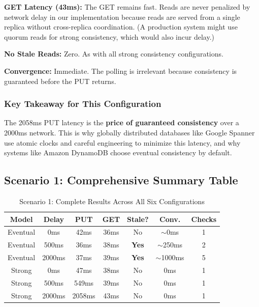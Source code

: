 \documentclass[10pt,a4paper]{article}
\begin{document}
\textbf{GET Latency (43ms):} The GET remains fast. Reads are never penalized by network delay in our implementation because reads are served from a single replica without cross-replica coordination. (A production system might use quorum reads for strong consistency, which would also incur delay.)

\textbf{No Stale Reads:} Zero. As with all strong consistency configurations.

\textbf{Convergence:} Immediate. The polling is irrelevant because consistency is guaranteed before the PUT returns.

\subsubsection{Key Takeaway for This Configuration}

The 2058ms PUT latency is the \textbf{price of guaranteed consistency} over a 2000ms network. This is why globally distributed databases like Google Spanner use atomic clocks and careful engineering to minimize this latency, and why systems like Amazon DynamoDB choose eventual consistency by default.

\subsection{Scenario 1: Comprehensive Summary Table}

\begin{table}[H]
\centering
\caption{Scenario 1: Complete Results Across All Six Configurations}
\begin{tabular}{|c|c|c|c|c|c|c|}
\hline
\textbf{Model} & \textbf{Delay} & \textbf{PUT} & \textbf{GET} & \textbf{Stale?} & \textbf{Conv.} & \textbf{Checks} \\
\hline
Eventual & 0ms & 42ms & 36ms & No & $\sim$0ms & 1 \\
Eventual & 500ms & 36ms & 38ms & \textbf{Yes} & $\sim$250ms & 2 \\
Eventual & 2000ms & 37ms & 39ms & \textbf{Yes} & $\sim$1000ms & 5 \\
\hline
Strong & 0ms & 47ms & 38ms & No & 0ms & 1 \\
Strong & 500ms & 549ms & 39ms & No & 0ms & 1 \\
Strong & 2000ms & 2058ms & 43ms & No & 0ms & 1 \\
\hline
\end{tabular}
\end{table}
\end{document}
